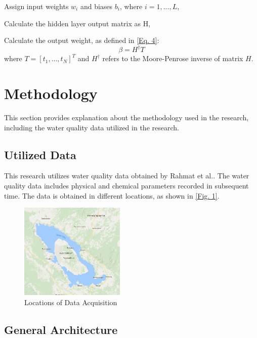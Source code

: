 \documentclass{ws-ijait}
\begin{document}
\begin{itemlist}
\item Assign input weights $w_{i}$ and biases $b_{i}$, where $i = 1, ..., L$,
\item Calculate the hidden layer output matrix as H,
\item Calculate the output weight, as defined in \eqref{Eq. 4}:
\begin{equation}
\beta = H^\dagger T\label{Eq. 4}
\end{equation}
where $T = [t_{1},...,t_{N}]^T$ and $H^\dagger$ refers to the Moore-Penrose inverse of matrix $H$.
\end{itemlist}

\section{Methodology}

This section provides explanation about the methodology used in the research, including the water quality data utilized in the research.

\subsection{Utilized Data}

This research utilizes water quality data obtained by Rahmat et al.\cite{16}. The water quality data includes physical and chemical parameters recorded in subsequent time. The data is obtained in different locations, as shown in \eqref{Fig. 1}.

\begin{figure}[th]
\centerline{\includegraphics[width=5cm]{map_data_acquisition.jpg}}
\vspace*{8pt}
\caption{Locations of Data Acquisition\cite{16}}
\label{Fig. 1}
\end{figure}

\subsection{General Architecture}
\end{document}
